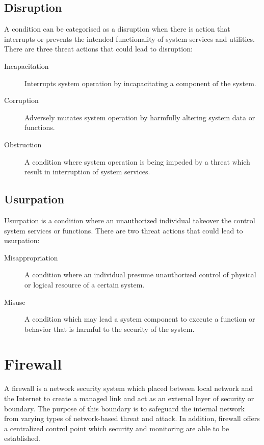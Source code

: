\documentclass[../index.tex]{subfiles}
\begin{document}
\subsection{Disruption}

A condition can be categorised as a disruption when there is action that interrupts or prevents the
intended functionality of system services and utilities. There are three threat actions that could
lead to disruption:

\begin{description}

  \item[Incapacitation] Interrupts system operation by incapacitating a component of the system.

  \item[Corruption] Adversely mutates system operation by harmfully altering system data or
    functions.

  \item[Obstruction] A condition where system operation is being impeded by a threat which result in
    interruption of system services.

\end{description}

\subsection{Usurpation}

Usurpation is a condition where an unauthorized individual takeover the control system services or
functions. There are two threat actions that could lead to usurpation:

\begin{description}

  \item[Misappropriation] A condition where an individual presume unauthorized control of physical
    or logical resource of a certain system.

  \item[Misuse] A condition which may lead a system component to execute a function or behavior that
    is harmful to the security of the system.

\end{description}

\section{Firewall}

A firewall is a network security system which placed between local network and the Internet to
create a managed link and act as an external layer of security or boundary. The purpose of this
boundary is to safeguard the internal network from varying types of network-based threat and attack.
In addition, firewall offers a centralized control point which security and monitoring are able to
be established.
\end{document}
